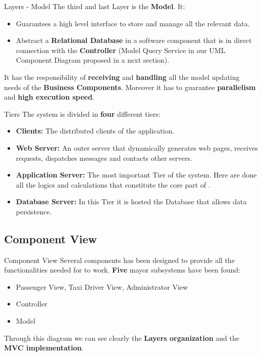 \documentclass{../common/latex_classes/pdf_presentation}
\begin{document}
	\begin{frame}{Layers - Model}
		The third and last Layer is the \textbf{Model}. It:
		\begin{itemize}
			\item Guarantees a high level interface to store and manage all the \myTaxiService{} relevant data.
			\item Abstract a \textbf{Relational Database} in a software component that is in direct connection with the \textbf{Controller} (Model Query Service in our UML Component Diagram proposed in a next section).
		\end{itemize}
		
		It has the responsibility of \textbf{receiving} and \textbf{handling} all the model updating needs of the \textbf{Business Components}. 
		Moreover it has to guarantee \textbf{parallelism} and \textbf{high execution speed}.
	\end{frame}
	
	\begin{frame}{Tiers}
		The system is divided in \textbf{four} different tiers:
		\begin{itemize}
			\item \textbf{Clients:} The distributed clients of the application.
			\item \textbf{Web Server:} An outer server that dynamically generates web pages, receives requests, dispatches messages and contacts other servers.
			\item \textbf{Application Server:} The most important Tier of the system. Here are done all the logics and calculations that constitute the core part of \myTaxiService{}.
			\item \textbf{Database Server:} In this Tier it is hosted the Database that allows data persistence.
		\end{itemize}
	\end{frame}
	
	\subsection{Component View}
	
	\begin{frame}{Component View}
		Several components has been designed to provide all the functionalities needed for \myTaxiService{} to work.
		\textbf{Five} mayor subsystems have been found:
		\begin{itemize}
			\item Passenger View, Taxi Driver View, Administrator View
			\item Controller
			\item Model
		\end{itemize}
		Through this diagram we can see clearly the \textbf{Layers organization} and the \textbf{MVC implementation}.
	\end{frame}
	
\end{document}

